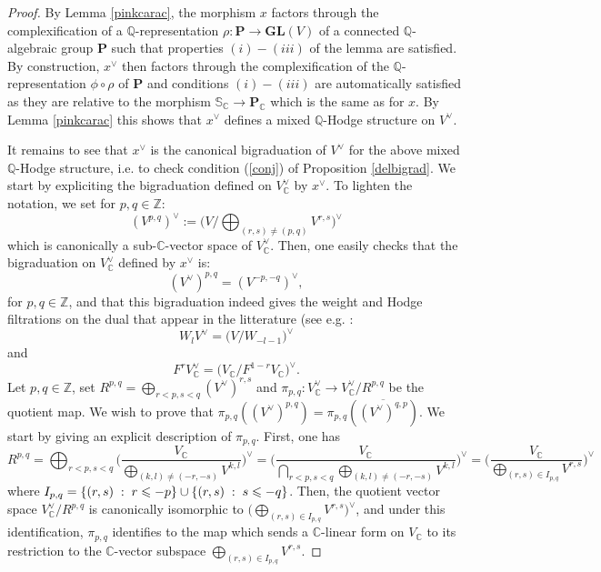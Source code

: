 \documentclass[10pt]{article}
\numberwithin{equation}{subsection}
\theoremstyle{plain}
\theoremstyle{definition}
\theoremstyle{remark}
\newcommand{\Z}{\mathbb Z}
\newcommand{\Q}{\mathbb Q}
\newcommand{\C}{\mathbb C}
\newcommand{\s}{\mathbb S}
\newcommand{\pp}{\mathbf P}
\newcommand{\gl}{\mathbf{GL}}
\begin{document}
\begin{proof}
By Lemma \ref{pinkcarac}, the morphism $x$ factors through the complexification of a $\Q$-representation $\rho : \pp \rightarrow \gl(V)$ of a connected $\Q$-algebraic group $\pp$ such that properties $(i)-(iii)$ of the lemma are satisfied. By construction, $x^\vee$ then factors through the complexification of the $\Q$-representation $\phi \circ \rho$ of $\pp$ and conditions $(i)-(iii)$ are automatically satisfied as they are relative to the morphism $\s_\C \rightarrow \pp_\C$ which is the same as for $x$. By Lemma \ref{pinkcarac} this shows that $x^\vee$ defines a mixed $\Q$-Hodge structure on $V^\vee$.

It remains to see that $x^\vee$ is the canonical bigraduation of $V^\vee$ for the above mixed $\Q$-Hodge structure, i.e. to check condition (\ref{conj}) of Proposition \ref{delbigrad}. We start by expliciting the bigraduation defined on $V^\vee_\C$ by $x^\vee$. To lighten the notation, we set for $p,q \in \Z$:
\[
(V^{p,q})^\vee := \Big(V /{\bigoplus_{(r,s) \neq (p,q)} V^{r,s}}\Big)^\vee
\]
which is canonically a sub-$\C$-vector space of $V_\C^\vee$. Then, one easily checks that the bigraduation on $V_\C^\vee$ defined by $x^\vee$ is:
\[
(V^\vee)^{p,q} = (V^{-p,-q})^\vee,
\]
for $p,q \in \Z$, and that this bigraduation indeed gives the weight and Hodge filtrations on the dual that appear in the litterature (see e.g. \cite[Sect. 1.1]{hodge2}:
\[
W_lV^\vee = \Big( V/W_{-l-1}\Big)^\vee
\]
and 
\[
F^rV_\C^\vee = \Big( V_\C/F^{1-r}V_\C\Big)^\vee.
\]
Let $p,q \in \Z$, set $R^{p,q} = \bigoplus_{r<p,s<q}(V^\vee)^{r,s}$ and $\pi_{p,q} : V^\vee_\C \rightarrow V^\vee_\C/R^{p,q}$ be the quotient map. We wish to prove that $\pi_{p,q}((V^\vee)^{p,q}) = \pi_{p,q}(\overline{(V^\vee)^{q,p}})$. We start by giving an explicit description of $\pi_{p,q}$. First, one has
{\small\[
R^{p,q} = \bigoplus_{r<p,s<q}\Big(\frac{V_\C}{\bigoplus_{(k,l) \neq (-r,-s)}V^{k,l}}\Big)^\vee =  \Big(\frac{V_\C}{\bigcap_{r<p,s<q} \bigoplus_{(k,l) \neq (-r,-s)} V^{k,l}}\Big)^\vee =  \Big(\frac{V_\C}{\bigoplus_{(r,s) \in I_{p,q}} V^{r,s}}\Big)^\vee
\]}
where $I_{p,q} = \{(r,s) \hspace{0.1cm} : \hspace{0.1cm} r \leqslant -p\} \cup \{(r,s) \hspace{0.1cm} : \hspace{0.1cm} s \leqslant -q\}$.
Then, the quotient vector space $V_\C^\vee / R^{p,q}$ is canonically isomorphic to $\Big(\bigoplus_{(r,s) \in I_{p,q}} V^{r,s}\Big)^\vee$, and under this identification, $\pi_{p,q}$ identifies to the map which sends a $\C$-linear form on $V_\C$ to its restriction to the $\C$-vector subspace $\bigoplus_{(r,s) \in I_{p,q}} V^{r,s}$.


\end{proof}
\end{document}
